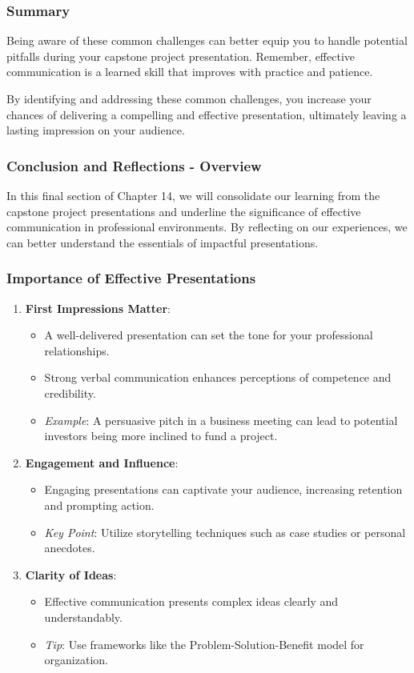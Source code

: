 \documentclass{beamer}
\begin{document}
\begin{frame}[fragile]
    \frametitle{Summary}
    Being aware of these common challenges can better equip you to handle potential pitfalls during your capstone project presentation. 
    Remember, effective communication is a learned skill that improves with practice and patience.
    
    By identifying and addressing these common challenges, you increase your chances of delivering a compelling and effective presentation, ultimately leaving a lasting impression on your audience.
\end{frame}

\begin{frame}[fragile]
    \frametitle{Conclusion and Reflections - Overview}
    In this final section of Chapter 14, we will consolidate our learning from the capstone project presentations and underline the significance of effective communication in professional environments. By reflecting on our experiences, we can better understand the essentials of impactful presentations.
\end{frame}

\begin{frame}[fragile]
    \frametitle{Importance of Effective Presentations}
    \begin{enumerate}
        \item \textbf{First Impressions Matter}:
        \begin{itemize}
            \item A well-delivered presentation can set the tone for your professional relationships.
            \item Strong verbal communication enhances perceptions of competence and credibility.
            \item \textit{Example}: A persuasive pitch in a business meeting can lead to potential investors being more inclined to fund a project.
        \end{itemize}

        \item \textbf{Engagement and Influence}:
        \begin{itemize}
            \item Engaging presentations can captivate your audience, increasing retention and prompting action.
            \item \textit{Key Point}: Utilize storytelling techniques such as case studies or personal anecdotes.
        \end{itemize}

        \item \textbf{Clarity of Ideas}:
        \begin{itemize}
            \item Effective communication presents complex ideas clearly and understandably.
            \item \textit{Tip}: Use frameworks like the Problem-Solution-Benefit model for organization.
        \end{itemize}
    \end{enumerate}
\end{frame}
\end{document}
